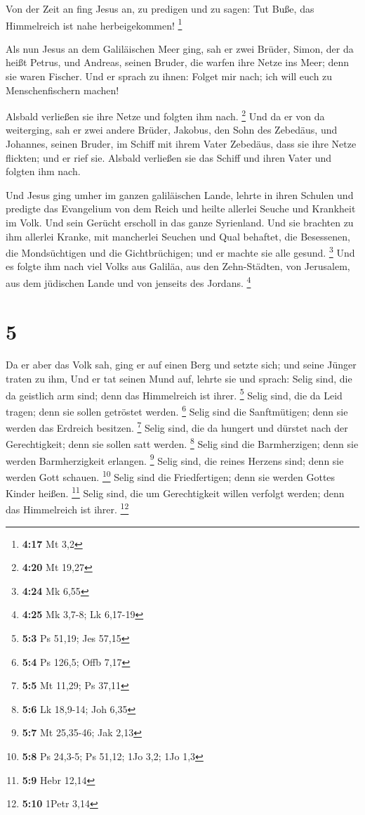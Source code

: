  Von der Zeit an fing Jesus an, zu predigen und zu sagen:
Tut Buße, das Himmelreich ist nahe herbeigekommen! \footnote{\textbf{4:17}
  Mt 3,2}

 Als nun Jesus an dem Galiläischen Meer ging, sah er zwei
Brüder, Simon, der da heißt Petrus, und Andreas, seinen Bruder, die
warfen ihre Netze ins Meer; denn sie waren Fischer.  Und
er sprach zu ihnen: Folget mir nach; ich will euch zu Menschenfischern
machen!

 Alsbald verließen sie ihre Netze und folgten ihm nach.
\footnote{\textbf{4:20} Mt 19,27}  Und da er von da
weiterging, sah er zwei andere Brüder, Jakobus, den Sohn des Zebedäus,
und Johannes, seinen Bruder, im Schiff mit ihrem Vater Zebedäus, dass
sie ihre Netze flickten; und er rief sie.  Alsbald
verließen sie das Schiff und ihren Vater und folgten ihm nach.

 Und Jesus ging umher im ganzen galiläischen Lande,
lehrte in ihren Schulen und predigte das Evangelium von dem Reich und
heilte allerlei Seuche und Krankheit im Volk.  Und sein
Gerücht erscholl in das ganze Syrienland. Und sie brachten zu ihm
allerlei Kranke, mit mancherlei Seuchen und Qual behaftet, die
Besessenen, die Mondsüchtigen und die Gichtbrüchigen; und er machte sie
alle gesund. \footnote{\textbf{4:24} Mk 6,55}  Und es
folgte ihm nach viel Volks aus Galiläa, aus den Zehn-Städten, von
Jerusalem, aus dem jüdischen Lande und von jenseits des Jordans.
\footnote{\textbf{4:25} Mk 3,7-8; Lk 6,17-19}

\hypertarget{section-3}{%
\section{5}\label{section-3}}

 Da er aber das Volk sah, ging er auf einen Berg und
setzte sich; und seine Jünger traten zu ihm,  Und er tat
seinen Mund auf, lehrte sie und sprach:  Selig sind, die
da geistlich arm sind; denn das Himmelreich ist ihrer. \footnote{\textbf{5:3}
  Ps 51,19; Jes 57,15}  Selig sind, die da Leid tragen;
denn sie sollen getröstet werden. \footnote{\textbf{5:4} Ps 126,5; Offb
  7,17}  Selig sind die Sanftmütigen; denn sie werden das
Erdreich besitzen. \footnote{\textbf{5:5} Mt 11,29; Ps 37,11}
 Selig sind, die da hungert und dürstet nach der
Gerechtigkeit; denn sie sollen satt werden. \footnote{\textbf{5:6} Lk
  18,9-14; Joh 6,35}  Selig sind die Barmherzigen; denn
sie werden Barmherzigkeit erlangen. \footnote{\textbf{5:7} Mt 25,35-46;
  Jak 2,13}  Selig sind, die reines Herzens sind; denn sie
werden Gott schauen. \footnote{\textbf{5:8} Ps 24,3-5; Ps 51,12; 1Jo
  3,2; 1Jo 1,3}  Selig sind die Friedfertigen; denn sie
werden Gottes Kinder heißen. \footnote{\textbf{5:9} Hebr 12,14}
 Selig sind, die um Gerechtigkeit willen verfolgt werden;
denn das Himmelreich ist ihrer. \footnote{\textbf{5:10} 1Petr 3,14}

